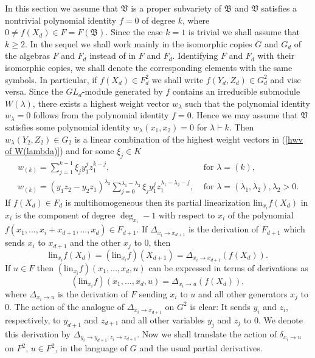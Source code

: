 \documentclass{amsart}[12pt]
\theoremstyle{definition}
\begin{document}
In this section we assume that $\mathfrak V$ is a proper subvariety of $\mathfrak B$ and $\mathfrak V$ satisfies a nontrivial polynomial identity
$f=0$ of degree $k$, where $0\not=f(X_d)\in F=F({\mathfrak B})$. Since the case $k=1$ is trivial we shall assume that $k\geq 2$.
In the sequel we shall work mainly in the isomorphic copies $G$ and $G_d$ of the algebras $F$ and $F_d$ instead of in $F$ and $F_d$.
Identifying $F$ and $F_d$ with their isomorphic copies, we shall denote the corresponding elements with the same symbols.
In particular, if $f(X_d)\in F_d^2$ we shall write $f(Y_d,Z_d)\in G_d^2$ and vise versa. 
Since the $GL_d$-module generated by $f$ contains an irreducible submodule $W(\lambda)$,
there exists a highest weight vector $w_{\lambda}$ such that the polynomial identity $w_{\lambda}=0$ follows from the polynomial identity $f=0$.
Hence we may assume that $\mathfrak V$ satisfies some polynomial identity $w_{\lambda}(x_1,x_2)=0$ for $\lambda\vdash k$.
Then $w_{\lambda}(Y_2,Z_2)\in G_2$ is a linear combination of the highest weight vectors in (\ref{hwv of W(lambda)}) and for some $\xi_j\in K$
\begin{equation}\label{hwv for subvariety}
\begin{split}
w_{(k)}=\sum_{j=1}^{k-1}\xi_jy_1^jz_1^{k-j},&\text{ for } \lambda=(k),\\
w_{(k)}=(y_1z_2-y_2z_1)^{\lambda_2}\sum_{j=0}^{\lambda_1-\lambda_2}\xi_jy_1^jz_1^{\lambda_1-\lambda_2-j},
&\text{ for } \lambda=(\lambda_1,\lambda_2),\lambda_2>0.
\end{split}
\end{equation}
If $f(X_d)\in F_d$ is multihomogeneous then its partial linearization
$\text{lin}_{x_i}f(X_d)$ in $x_i$ is the component of degree $\deg_{x_i}-1$ with respect to $x_i$ of the polynomial
$f(x_1,\ldots,x_i+x_{d+1},\ldots,x_d)\in F_{d+1}$. If $\Delta_{x_i\to x_{d+1}}$ is the derivation of $F_{d+1}$
which sends $x_i$ to $x_{d+1}$ and the other $x_j$ to 0,
then
\[
\text{lin}_{x_i}f(X_d)=(\text{lin}_{x_i}f)(X_{d+1})=\Delta_{x_i\to x_{d+1}}(f(X_d)).
\]
If $u\in F$ then $(\text{lin}_{x_i}f)(x_1,\ldots,x_d,u)$ can be expressed in terms of derivations as
\[
(\text{lin}_{x_i}f)(x_1,\ldots,x_d,u)=\Delta_{x_i\to u}(f(X_d)),
\]
where $\Delta_{x_i\to u}$ is the derivation of $F$ sending $x_i$ to $u$ and all other generators $x_j$ to 0.
The action of the analogue of $\Delta_{x_i\to x_{d+1}}$ on $G^2$ is clear: It sends $y_i$ and $z_i$, respectively, to $y_{d+1}$ and $z_{d+1}$ and all other
variables $y_j$ and $z_j$ to 0. We denote this derivation by $\Delta_{y_i\to y_{d+1},z_i\to z_{d+1}}$.
Now we shall translate the action of $\delta_{x_i\to u}$ on $F^2$, $u\in F^2$,
in the language of $G$ and the usual partial derivatives.
\end{document}
